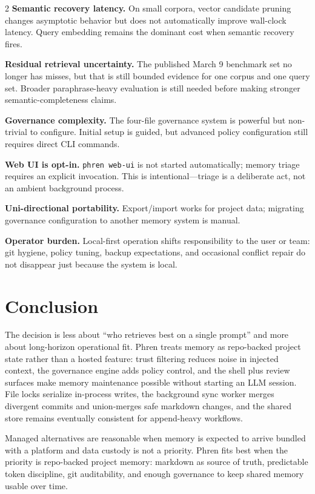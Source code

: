 \documentclass[10pt]{article}
\begin{document}
\begin{multicols}{2}
\textbf{Semantic recovery latency.} On small corpora, vector candidate pruning changes asymptotic behavior but does not automatically improve wall-clock latency. Query embedding remains the dominant cost when semantic recovery fires.

\textbf{Residual retrieval uncertainty.} The published March 9 benchmark set no longer has misses, but that is still bounded evidence for one corpus and one query set. Broader paraphrase-heavy evaluation is still needed before making stronger semantic-completeness claims.

\textbf{Governance complexity.} The four-file governance system is powerful but non-trivial to configure. Initial setup is guided, but advanced policy configuration still requires direct CLI commands.

\textbf{Web UI is opt-in.} \texttt{phren web-ui} is not started automatically; memory triage requires an explicit invocation. This is intentional---triage is a deliberate act, not an ambient background process.

\textbf{Uni-directional portability.} Export/import works for project data; migrating governance configuration to another memory system is manual.

\textbf{Operator burden.} Local-first operation shifts responsibility to the user or team: git hygiene, policy tuning, backup expectations, and occasional conflict repair do not disappear just because the system is local.

\pagebreak[2]
\section{Conclusion}
The decision is less about ``who retrieves best on a single prompt'' and more about long-horizon operational fit. Phren treats memory as repo-backed project state rather than a hosted feature: trust filtering reduces noise in injected context, the governance engine adds policy control, and the shell plus review surfaces make memory maintenance possible without starting an LLM session. File locks serialize in-process writes, the background sync worker merges divergent commits and union-merges safe markdown changes, and the shared store remains eventually consistent for append-heavy workflows.

Managed alternatives are reasonable when memory is expected to arrive bundled with a platform and data custody is not a priority. Phren fits best when the priority is repo-backed project memory: markdown as source of truth, predictable token discipline, git auditability, and enough governance to keep shared memory usable over time.

\end{multicols}
\end{document}
